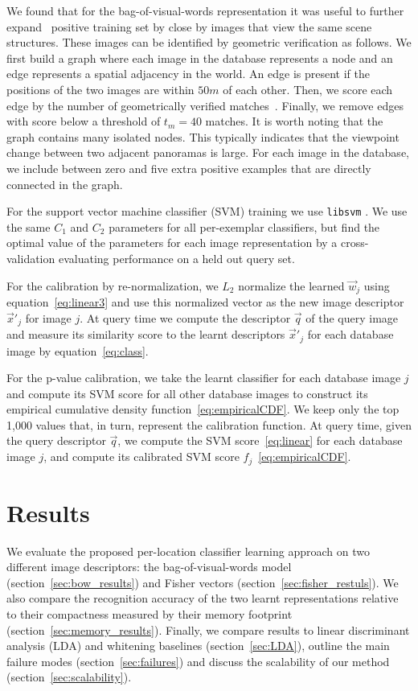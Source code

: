       We found that for the bag-of-visual-words representation it was useful to further expand~\cite{Chum07b} positive training set by close by images that view the same scene structures. These images can be identified by geometric verification \cite{Philbin07} as follows.
      We first build a graph where each image in the database represents a node and an edge represents a spatial adjacency in the world. An edge is present if the positions of the two images are within $50m$ of each other.
      Then, we score each edge by the number of geometrically verified matches~\cite{Philbin07}. Finally, we remove edges with score below a threshold of $t_m = 40$ matches. 
      It is worth noting that the graph contains many isolated nodes. This typically indicates that the viewpoint change between two adjacent panoramas is large. For each image in the database, we include between zero and five extra positive examples that are directly connected in the graph.


      For the support vector machine classifier (SVM) training we use {\tt libsvm} \cite{libsvm}. We use the same $C_1$ and $C_2$ parameters for all per-exemplar classifiers, but find the optimal value of the parameters for each image representation by a cross-validation evaluating performance on a held out query set.

      For the calibration by re-normalization, we $L_2$ normalize the learned $\vec{w}_j$ using equation~\eqref{eq:linear3} and use this normalized vector as the new image descriptor $\vec{x}'_j$ for image $j$. At query time we compute the descriptor $\vec{q}$ of the query image and measure its similarity score to the learnt descriptors $\vec{x}'_j$ for each database image by equation~\eqref{eq:class}.

      For the p-value calibration, we take the learnt classifier for each database image $j$ and compute its SVM score for all other database images to construct its empirical cumulative density function~\eqref{eq:empiricalCDF}. We keep only the top 1,000 values that, in turn, represent the calibration function. At query time, given the query descriptor $\vec{q}$, we compute the SVM score~\eqref{eq:linear} for each database image $j$, and compute its calibrated SVM score $f_j$~\eqref{eq:empiricalCDF}.


\section{Results}
\label{sec:results}
  We evaluate the proposed per-location classifier learning approach on two different image descriptors: the bag-of-visual-words model (section~\ref{sec:bow_results}) and Fisher vectors (section~\ref{sec:fisher_restuls}).  We also compare the recognition accuracy of the two learnt representations relative to their compactness measured by their memory footprint (section~\ref{sec:memory_results}).
  {  
    Finally, we compare results to linear discriminant analysis (LDA) and whitening baselines (section~\ref{sec:LDA}), outline the main failure modes (section~\ref{sec:failures}) and discuss the scalability of our method (section~\ref{sec:scalability}).  
  } 
  
